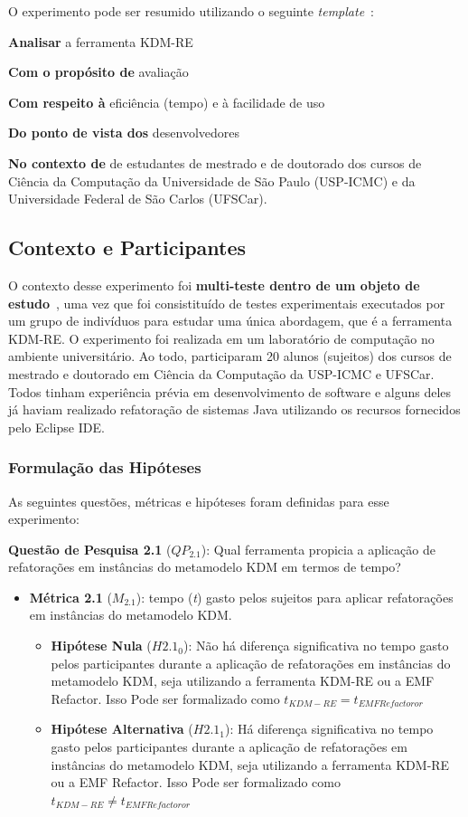 O experimento pode ser resumido utilizando o seguinte \textit{template}~\cite{Wohlin}:

\textbf{Analisar} a ferramenta KDM-RE

\textbf{Com o propósito de} avaliação

\textbf{Com respeito à} eficiência (tempo) e à facilidade de uso

\textbf{Do ponto de vista dos} desenvolvedores

\textbf{No contexto de } de estudantes de mestrado e de doutorado dos cursos de Ciência da Computação da Universidade de São Paulo (USP-ICMC) e da Universidade Federal de São Carlos (UFSCar).

\subsection{Contexto e Participantes}

O contexto desse experimento foi \textbf{multi-teste dentro de um objeto de estudo}~\cite{Wohlin}, uma vez que foi consistituído de testes experimentais executados por um grupo de indivíduos para estudar uma única abordagem, que é a ferramenta KDM-RE. O experimento foi realizada em um laboratório de computação no ambiente universitário. Ao todo, participaram 20 alunos (sujeitos) dos cursos de mestrado e doutorado em Ciência da Computação da USP-ICMC e UFSCar. Todos tinham experiência prévia em desenvolvimento de software e alguns deles já haviam realizado refatoração de sistemas Java utilizando os recursos fornecidos pelo Eclipse IDE.

\subsubsection{Formulação das Hipóteses}

As seguintes questões, métricas e hipóteses foram definidas para esse experimento:

\textbf{Questão de Pesquisa 2.1} (\textbf{$QP_{2.1}$}): Qual ferramenta propicia a aplicação de refatorações em instâncias do metamodelo KDM em termos de tempo?

\begin{itemize}
\item \textbf{Métrica 2.1} (\textbf{$M_{2.1}$}): tempo (\textit{t}) gasto pelos sujeitos para aplicar refatorações em instâncias do metamodelo KDM.
\begin{itemize}
\item \textbf{Hipótese Nula} (\textbf{$H2.1_0$}): Não há diferença significativa no tempo gasto pelos participantes durante a aplicação de refatorações em instâncias do metamodelo KDM, seja utilizando a ferramenta KDM-RE ou a EMF Refactor. Isso Pode ser formalizado como $t_{KDM-RE} = t_{EMF Refactoror}$
\item \textbf{Hipótese Alternativa} (\textbf{$H2.1_1$}): Há diferença significativa no tempo gasto pelos participantes durante a aplicação de refatorações em instâncias do metamodelo KDM, seja utilizando a ferramenta KDM-RE ou a EMF Refactor. Isso Pode ser formalizado como $t_{KDM-RE} \neq t_{EMF Refactoror}$
\end{itemize}
\end{itemize}

